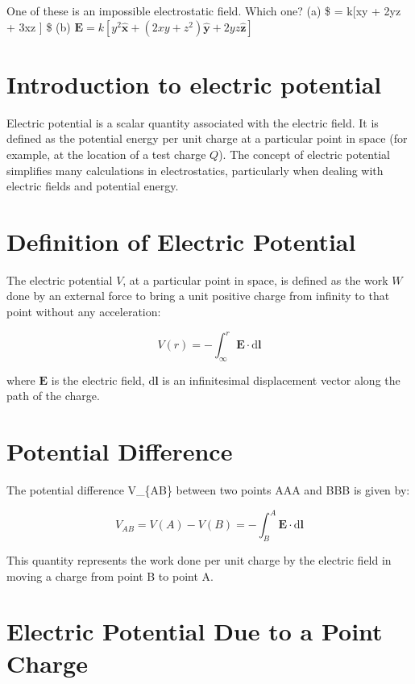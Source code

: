 \documentclass[
  letterpaper,
  DIV=11,
  numbers=noendperiod]{scrreprt}
\begin{document}
One of these is an impossible electrostatic field. Which one? (a)
\$ = k{[}xy  +
2yz + 3xz  {]} \$ (b)
\(\mathrm{\mathbf{E}}= k[y^2 \hat{\mathrm{\mathbf{x}}} + (2xy + z^2)\hat{\mathrm{\mathbf{y}}} + 2yz \hat{\mathrm{\mathbf{z}}} ]\)

\section{Introduction to electric
potential}\label{introduction-to-electric-potential}

Electric potential is a scalar quantity associated with the electric
field. It is defined as the potential energy per unit charge at a
particular point in space (for example, at the location of a test charge
\(Q\)). The concept of electric potential simplifies many calculations
in electrostatics, particularly when dealing with electric fields and
potential energy.

\section{Definition of Electric
Potential}\label{definition-of-electric-potential}

The electric potential \(V\), at a particular point in space, is defined
as the work \(W\) done by an external force to bring a unit positive
charge from infinity to that point without any acceleration:

\[ V(r)=−\int_\infty^r \mathrm{\mathbf{E}}\cdot \mathrm{d}\mathrm{\mathbf{l}}\]

where \(\mathrm{\mathbf{E}}\) is the electric field,
\(\mathrm{d}\mathrm{\mathbf{l}}\) is an infinitesimal displacement
vector along the path of the charge.

\section{Potential Difference}\label{potential-difference}

The potential difference V\_\{AB\} between two points AAA and BBB is
given by:

\[ V_{AB} = V(A) − V(B) = -\int_{B}^{A} \mathrm{\mathbf{E}}\cdot \mathrm{d} \mathrm{\mathbf{l}}\]

This quantity represents the work done per unit charge by the electric
field in moving a charge from point B to point A.

\section{Electric Potential Due to a Point
Charge}\label{electric-potential-due-to-a-point-charge}
\end{document}
